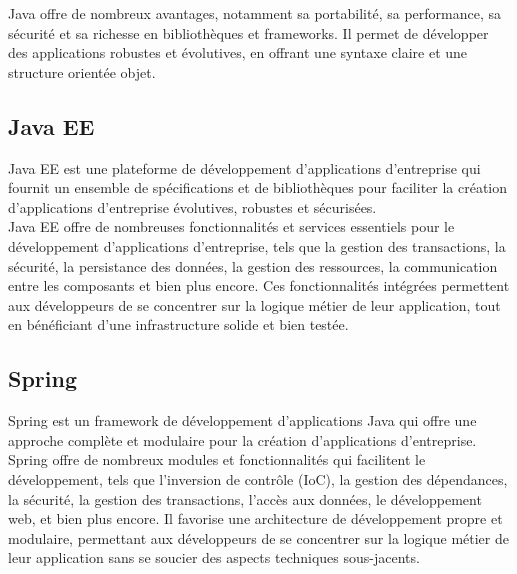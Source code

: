 Java offre de nombreux avantages, notamment sa portabilité, sa performance, sa sécurité et sa richesse en bibliothèques et frameworks. Il permet de développer des applications robustes et évolutives, en offrant une syntaxe claire et une structure orientée objet.


\subsection*{Java EE}
Java EE est une plateforme de développement d'applications d'entreprise qui fournit un ensemble de spécifications et de bibliothèques pour faciliter la création d'applications d'entreprise évolutives, robustes et sécurisées.\\

Java EE offre de nombreuses fonctionnalités et services essentiels pour le développement d'applications d'entreprise, tels que la gestion des transactions, la sécurité, la persistance des données, la gestion des ressources, la communication entre les composants et bien plus encore. Ces fonctionnalités intégrées permettent aux développeurs de se concentrer sur la logique métier de leur application, tout en bénéficiant d'une infrastructure solide et bien testée.

\subsection*{Spring}
Spring est un framework de développement d'applications Java qui offre une approche complète et modulaire pour la création d'applications d'entreprise.\\

Spring offre de nombreux modules et fonctionnalités qui facilitent le développement, tels que l'inversion de contrôle (IoC), la gestion des dépendances, la sécurité, la gestion des transactions, l'accès aux données, le développement web, et bien plus encore. Il favorise une architecture de développement propre et modulaire, permettant aux développeurs de se concentrer sur la logique métier de leur application sans se soucier des aspects techniques sous-jacents.

